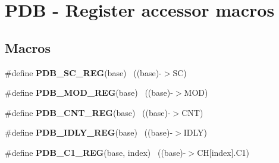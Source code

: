 \hypertarget{group___p_d_b___register___accessor___macros}{}\section{P\+D\+B -\/ Register accessor macros}
\label{group___p_d_b___register___accessor___macros}
\subsection*{Macros}
\begin{DoxyCompactItemize}
\item 
\hypertarget{group___p_d_b___register___accessor___macros_ga1591bd73f684fdc755e12eef3d570734}{}\#define {\bfseries P\+D\+B\+\_\+\+S\+C\+\_\+\+R\+E\+G}(base)                                              ~((base)-\/$>$S\+C)\label{group___p_d_b___register___accessor___macros_ga1591bd73f684fdc755e12eef3d570734}

\item 
\hypertarget{group___p_d_b___register___accessor___macros_ga8c8a28c2bc66773f6820aaa1badaffcc}{}\#define {\bfseries P\+D\+B\+\_\+\+M\+O\+D\+\_\+\+R\+E\+G}(base)                                            ~((base)-\/$>$M\+O\+D)\label{group___p_d_b___register___accessor___macros_ga8c8a28c2bc66773f6820aaa1badaffcc}

\item 
\hypertarget{group___p_d_b___register___accessor___macros_ga3bc07ddecbb4c1fe42bb5953e703cca0}{}\#define {\bfseries P\+D\+B\+\_\+\+C\+N\+T\+\_\+\+R\+E\+G}(base)                                            ~((base)-\/$>$C\+N\+T)\label{group___p_d_b___register___accessor___macros_ga3bc07ddecbb4c1fe42bb5953e703cca0}

\item 
\hypertarget{group___p_d_b___register___accessor___macros_ga117aa5730c78ef78a2c18f49cf9a7663}{}\#define {\bfseries P\+D\+B\+\_\+\+I\+D\+L\+Y\+\_\+\+R\+E\+G}(base)                                          ~((base)-\/$>$I\+D\+L\+Y)\label{group___p_d_b___register___accessor___macros_ga117aa5730c78ef78a2c18f49cf9a7663}

\item 
\hypertarget{group___p_d_b___register___accessor___macros_ga5786cd17977be8e085fe0157ec4c15fe}{}\#define {\bfseries P\+D\+B\+\_\+\+C1\+\_\+\+R\+E\+G}(base,  index)                                  ~((base)-\/$>$C\+H\mbox{[}index\mbox{]}.C1)\label{group___p_d_b___register___accessor___macros_ga5786cd17977be8e085fe0157ec4c15fe}


\end{DoxyCompactItemize}
